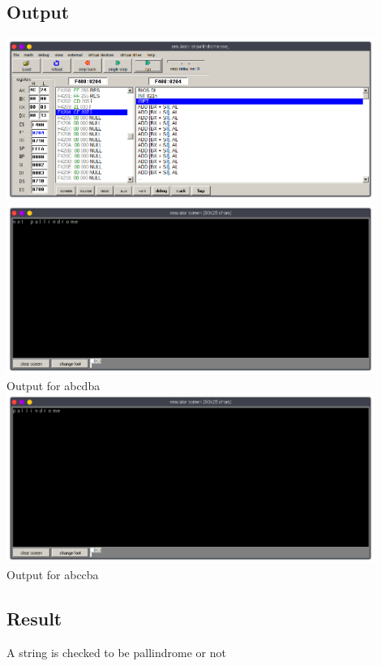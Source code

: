\subsection{Output}
\begin{center}
	\includegraphics[width=0.90\textwidth]{img/p17/ss1.png}
	\includegraphics[width=0.90\textwidth]{img/p17/ss2.png}\\
    Output for abcdba\\

    \includegraphics[width=0.90\textwidth]{img/p17/ss3.png}\\
    Output for abccba\\
\end{center}

\subsection{Result}
A string is checked to be pallindrome or not

